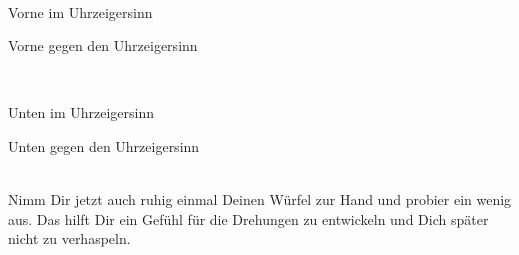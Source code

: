 \\[5em]
\begin{instruction}{Vorne im Uhrzeigersinn}
  \RubikCubeSolved%
  \quad{}
\end{instruction}
\hfil
\begin{instruction}{Vorne gegen den Uhrzeigersinn}
  \RubikCubeSolved%
  \quad{}
\end{instruction}
\\[5em]
\begin{instruction}{Unten im Uhrzeigersinn}
  \RubikCubeSolved%
  \quad{}
\end{instruction}
\hfil
\begin{instruction}{Unten gegen den Uhrzeigersinn}
  \RubikCubeSolved%
  \quad{}
\end{instruction}
\\[2em]

Nimm Dir jetzt auch ruhig einmal Deinen Würfel zur Hand und probier ein wenig aus.
Das hilft Dir ein Gefühl für die Drehungen zu entwickeln und Dich später nicht zu verhaspeln.
